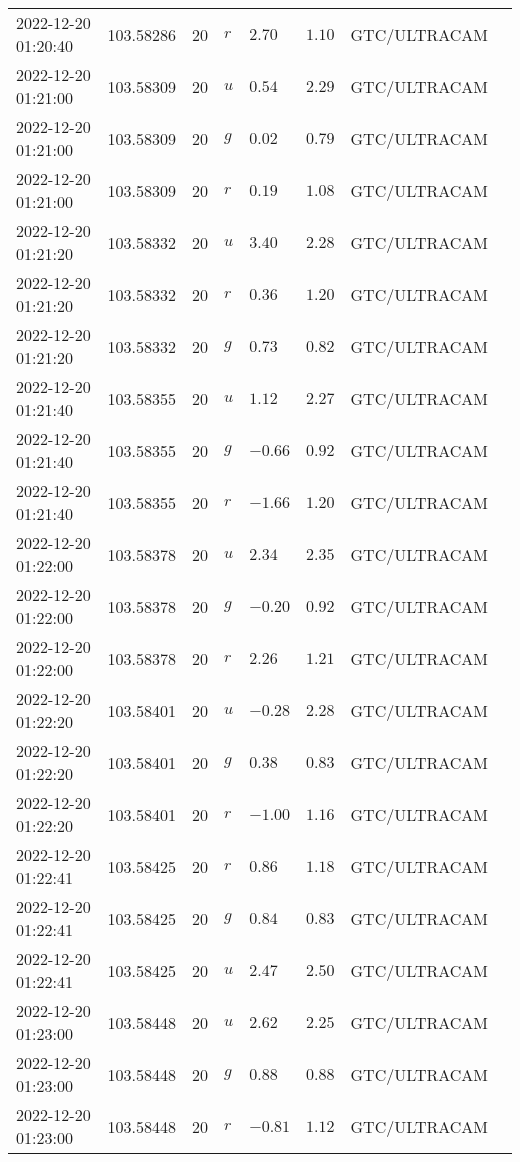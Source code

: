 \documentclass{nature_plusfigure}
\begin{document}
\begin{supplement}
\begin{center}
\begin{longtable}{llllllll}
2022-12-20 01:20:40 & 103.58286 & 20 & $r$ & $2.70$ & $1.10$ & GTC/ULTRACAM &  \\ 
2022-12-20 01:21:00 & 103.58309 & 20 & $u$ & $0.54$ & $2.29$ & GTC/ULTRACAM &  \\ 
2022-12-20 01:21:00 & 103.58309 & 20 & $g$ & $0.02$ & $0.79$ & GTC/ULTRACAM &  \\ 
2022-12-20 01:21:00 & 103.58309 & 20 & $r$ & $0.19$ & $1.08$ & GTC/ULTRACAM &  \\ 
2022-12-20 01:21:20 & 103.58332 & 20 & $u$ & $3.40$ & $2.28$ & GTC/ULTRACAM &  \\ 
2022-12-20 01:21:20 & 103.58332 & 20 & $r$ & $0.36$ & $1.20$ & GTC/ULTRACAM &  \\ 
2022-12-20 01:21:20 & 103.58332 & 20 & $g$ & $0.73$ & $0.82$ & GTC/ULTRACAM &  \\ 
2022-12-20 01:21:40 & 103.58355 & 20 & $u$ & $1.12$ & $2.27$ & GTC/ULTRACAM &  \\ 
2022-12-20 01:21:40 & 103.58355 & 20 & $g$ & $-0.66$ & $0.92$ & GTC/ULTRACAM &  \\ 
2022-12-20 01:21:40 & 103.58355 & 20 & $r$ & $-1.66$ & $1.20$ & GTC/ULTRACAM &  \\ 
2022-12-20 01:22:00 & 103.58378 & 20 & $u$ & $2.34$ & $2.35$ & GTC/ULTRACAM &  \\ 
2022-12-20 01:22:00 & 103.58378 & 20 & $g$ & $-0.20$ & $0.92$ & GTC/ULTRACAM &  \\ 
2022-12-20 01:22:00 & 103.58378 & 20 & $r$ & $2.26$ & $1.21$ & GTC/ULTRACAM &  \\ 
2022-12-20 01:22:20 & 103.58401 & 20 & $u$ & $-0.28$ & $2.28$ & GTC/ULTRACAM &  \\ 
2022-12-20 01:22:20 & 103.58401 & 20 & $g$ & $0.38$ & $0.83$ & GTC/ULTRACAM &  \\ 
2022-12-20 01:22:20 & 103.58401 & 20 & $r$ & $-1.00$ & $1.16$ & GTC/ULTRACAM &  \\ 
2022-12-20 01:22:41 & 103.58425 & 20 & $r$ & $0.86$ & $1.18$ & GTC/ULTRACAM &  \\ 
2022-12-20 01:22:41 & 103.58425 & 20 & $g$ & $0.84$ & $0.83$ & GTC/ULTRACAM &  \\ 
2022-12-20 01:22:41 & 103.58425 & 20 & $u$ & $2.47$ & $2.50$ & GTC/ULTRACAM &  \\ 
2022-12-20 01:23:00 & 103.58448 & 20 & $u$ & $2.62$ & $2.25$ & GTC/ULTRACAM &  \\ 
2022-12-20 01:23:00 & 103.58448 & 20 & $g$ & $0.88$ & $0.88$ & GTC/ULTRACAM &  \\ 
2022-12-20 01:23:00 & 103.58448 & 20 & $r$ & $-0.81$ & $1.12$ & GTC/ULTRACAM &  \\ 

\end{longtable}
\end{center}
\end{supplement}
\end{document}
